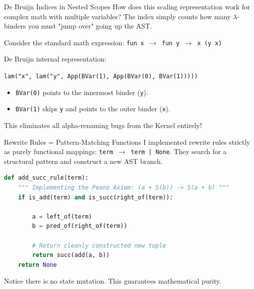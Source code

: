 \documentclass[aspectratio=169, 10pt]{beamer}
\begin{document}
\begin{frame}[fragile]{De Bruijn Indices in Nested Scopes}
    How does this scaling representation work for complex math with multiple variables? The index simply counts how many $\lambda$-binders you must "jump over" going up the AST.
    
    \vspace{1em}
    Consider the standard math expression: \texttt{fun x $\rightarrow$ fun y $\rightarrow$ x (y x)}
    
    \vspace{1em}
    De Bruijn internal representation:
    \begin{center}
    \texttt{lam("x", lam("y", App(BVar(1), App(BVar(0), BVar(1)))))}
    \end{center}
    
    \vspace{1em}
    \begin{itemize}
        \item \texttt{BVar(0)} points to the innermost binder (\texttt{y}).
        \item \texttt{BVar(1)} skips \texttt{y} and points to the outer binder (\texttt{x}).
    \end{itemize}
    This eliminates all alpha-renaming bugs from the Kernel entirely!
\end{frame}

\begin{frame}[fragile]{Rewrite Rules = Pattern-Matching Functions}
    I implemented rewrite rules strictly as purely functional mappings: \texttt{term $\rightarrow$ term | None}. They search for a structural pattern and construct a new AST branch.
    
\begin{lstlisting}[language=Python]
def add_succ_rule(term):
    """ Implementing the Peano Axiom: (a + S(b)) -> S(a + b) """
    if is_add(term) and is_succ(right_of(term)):
        
        a = left_of(term)
        b = pred_of(right_of(term))  
        
        # Return cleanly constructed new tuple
        return succ(add(a, b))       
    return None
\end{lstlisting}

    Notice there is no state mutation. This guarantees mathematical purity.
\end{frame}
\end{document}
